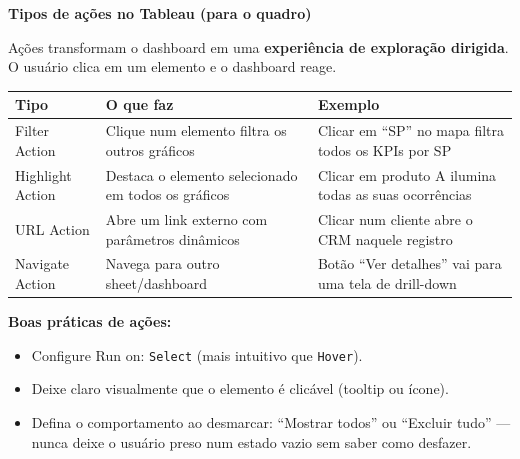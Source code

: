 \begin{BoardBox}
\textbf{Tipos de ações no Tableau (para o quadro)}

Ações transformam o dashboard em uma \textbf{experiência de exploração dirigida}.
O usuário clica em um elemento e o dashboard reage.

\begin{tabular}{|l|p{5.5cm}|p{4.5cm}|}
\hline
\textbf{Tipo} & \textbf{O que faz} & \textbf{Exemplo} \\
\hline
Filter Action & Clique num elemento filtra os outros gráficos & Clicar em ``SP'' no mapa filtra todos os KPIs por SP \\
Highlight Action & Destaca o elemento selecionado em todos os gráficos & Clicar em produto A ilumina todas as suas ocorrências \\
URL Action & Abre um link externo com parâmetros dinâmicos & Clicar num cliente abre o CRM naquele registro \\
Navigate Action & Navega para outro sheet/dashboard & Botão ``Ver detalhes'' vai para uma tela de drill-down \\
\hline
\end{tabular}

\textbf{Boas práticas de ações:}
\begin{itemize}
  \item Configure Run on: \texttt{Select} (mais intuitivo que \texttt{Hover}).
  \item Deixe claro visualmente que o elemento é clicável (tooltip ou ícone).
  \item Defina o comportamento ao desmarcar: ``Mostrar todos'' ou ``Excluir tudo''
  — nunca deixe o usuário preso num estado vazio sem saber como desfazer.
\end{itemize}
\end{BoardBox}


